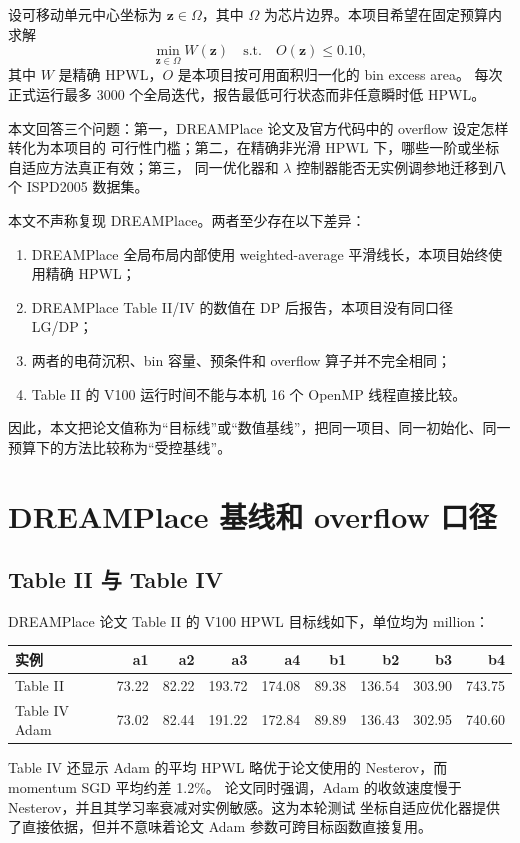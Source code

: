 \documentclass[UTF8,fontset=windows,a4paper,11pt]{ctexart}
\begin{document}
设可移动单元中心坐标为 $\bm z\in\Omega$，其中 $\Omega$ 为芯片边界。本项目希望在固定预算内求解
\begin{equation}
  \min_{\bm z\in\Omega} W(\bm z)
  \quad\text{s.t.}\quad O(\bm z)\leq 0.10,
  \label{eq:constrained}
\end{equation}
其中 $W$ 是精确 HPWL，$O$ 是本项目按可用面积归一化的 bin excess area。
每次正式运行最多 3000 个全局迭代，报告最低可行状态而非任意瞬时低 HPWL。

本文回答三个问题：第一，DREAMPlace 论文及官方代码中的 overflow 设定怎样转化为本项目的
可行性门槛；第二，在精确非光滑 HPWL 下，哪些一阶或坐标自适应方法真正有效；第三，
同一优化器和 $\lambda$ 控制器能否无实例调参地迁移到八个 ISPD2005 数据集。

本文不声称复现 DREAMPlace。两者至少存在以下差异：
\begin{enumerate}
  \item DREAMPlace 全局布局内部使用 weighted-average 平滑线长，本项目始终使用精确 HPWL；
  \item DREAMPlace Table II/IV 的数值在 DP 后报告，本项目没有同口径 LG/DP；
  \item 两者的电荷沉积、bin 容量、预条件和 overflow 算子并不完全相同；
  \item Table II 的 V100 运行时间不能与本机 16 个 OpenMP 线程直接比较。
\end{enumerate}
因此，本文把论文值称为“目标线”或“数值基线”，把同一项目、同一初始化、同一预算下的方法比较称为“受控基线”。

\section{DREAMPlace 基线和 overflow 口径}

\subsection{Table II 与 Table IV}

DREAMPlace 论文 Table II 的 V100 HPWL 目标线如下，单位均为 million：
\begin{center}
\begin{tabular}{lrrrrrrrr}
\toprule
实例 & a1 & a2 & a3 & a4 & b1 & b2 & b3 & b4\\
\midrule
Table II & 73.22 & 82.22 & 193.72 & 174.08 & 89.38 & 136.54 & 303.90 & 743.75\\
Table IV Adam & 73.02 & 82.44 & 191.22 & 172.84 & 89.89 & 136.43 & 302.95 & 740.60\\
\bottomrule
\end{tabular}
\end{center}
Table IV 还显示 Adam 的平均 HPWL 略优于论文使用的 Nesterov，而 momentum SGD 平均约差 1.2\%。
论文同时强调，Adam 的收敛速度慢于 Nesterov，并且其学习率衰减对实例敏感。这为本轮测试
坐标自适应优化器提供了直接依据，但并不意味着论文 Adam 参数可跨目标函数直接复用。
\end{document}
